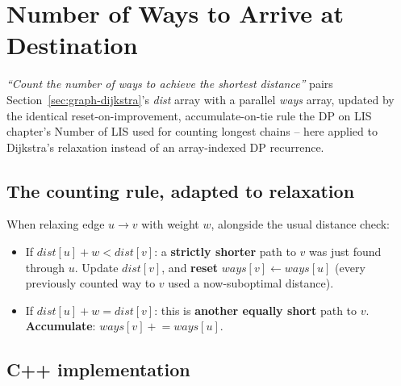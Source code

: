 \section{Number of Ways to Arrive at Destination}
\label{sec:graph-number-of-ways-arrive}


\begin{patternbox}
\emph{``Count the number of ways to achieve the shortest distance''}
pairs Section~\ref{sec:graph-dijkstra}'s \textit{dist} array with a
parallel \textit{ways} array, updated by the identical
reset-on-improvement, accumulate-on-tie rule the DP on LIS chapter's
Number of LIS used for counting longest chains -- here applied to
Dijkstra's relaxation instead of an array-indexed DP recurrence.
\end{patternbox}

\subsection*{The counting rule, adapted to relaxation}

When relaxing edge $u \to v$ with weight $w$, alongside the usual
distance check:
\begin{itemize}
  \item If $\textit{dist}[u] + w < \textit{dist}[v]$: a
        \textbf{strictly shorter} path to $v$ was just found through
        $u$. Update $\textit{dist}[v]$, and \textbf{reset}
        $\textit{ways}[v] \gets \textit{ways}[u]$ (every previously
        counted way to $v$ used a now-suboptimal distance).
  \item If $\textit{dist}[u] + w = \textit{dist}[v]$: this is
        \textbf{another equally short} path to $v$. \textbf{Accumulate}:
        $\textit{ways}[v] \mathrel{+}= \textit{ways}[u]$.
\end{itemize}

\subsection*{C++ implementation}

